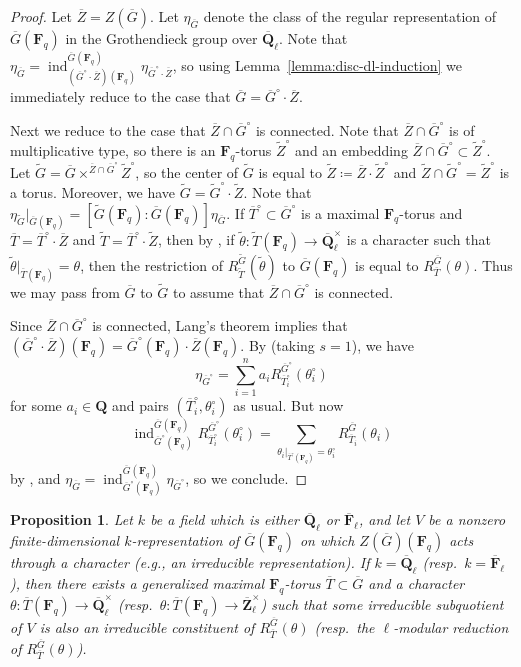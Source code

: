 \documentclass[reqno]{amsart}
\numberwithin{equation}{subsection}
\newcommand{\F}{\mathbf{F}}
\newcommand{\wt}[1]{\widetilde{#1}}
\newcommand{\Q}{\mathbf{Q}}
\newcommand{\Z}{\mathbf{Z}}
\newcommand{\ol}[1]{\overline{#1}}
\newcommand{\co}{\colon}
\DeclareMathOperator{\ind}{ind}
\newtheorem{prop}[thm]{Proposition}
\theoremstyle{remark}
\numberwithin{equation}{subsection}
\numberwithin{figure}{subsection}
\begin{document}
\begin{proof}
    Let $\ol Z = Z(\ol G)$. Let $\eta_{\ol G}$ denote the class of the regular representation of $\ol G(\F_q)$ in the Grothendieck group over $\ol\Q_\ell$. Note that $\eta_{\ol G} = \ind_{(\ol G^\circ \cdot \ol Z)(\F_q)}^{\ol G(\F_q)} \eta_{\ol G^\circ \cdot \ol Z}$, so using Lemma~\ref{lemma:disc-dl-induction} we immediately reduce to the case that $\ol G = \ol G^\circ \cdot \ol Z$.
    
    Next we reduce to the case that $\ol Z \cap \ol G^\circ$ is connected. Note that $\ol Z \cap \ol G^\circ$ is of multiplicative type, so there is an $\F_q$-torus $\wt Z^\circ$ and an embedding $\ol Z \cap \ol G^\circ \subset \wt Z^\circ$. Let $\wt G = \ol G \times^{\ol Z \cap \ol G^\circ} \wt Z^\circ$, so the center of $\wt G$ is equal to $\wt Z \coloneqq \ol Z \cdot \wt Z^\circ$ and $\wt Z \cap \wt G^\circ = \wt Z^\circ$ is a torus. Moreover, we have $\wt G = \wt G^\circ \cdot \wt Z$. Note that $\eta_{\wt G}|_{\ol G(\F_q)} = [\wt G(\F_q)\co \ol G(\F_q)] \eta_{\ol G}$. If $\ol T^\circ \subset \ol G^\circ$ is a maximal $\F_q$-torus and $\ol T = \ol T^\circ \cdot \ol Z$ and $\wt T = \ol T^\circ \cdot \wt Z$, then by \cite[Remark 2.6.5]{Kal21b}, if $\wt\theta\co \wt T(\F_q) \to \ol\Q_\ell^\times$ is a character such that $\wt\theta|_{\ol T(\F_q)} = \theta$, then the restriction of $R_{\wt T}^{\wt G}(\wt\theta)$ to $\ol G(\F_q)$ is equal to $R_{\ol T}^{\ol G}(\theta)$. Thus we may pass from $\ol G$ to $\wt G$ to assume that $\ol Z \cap \ol G^\circ$ is connected.
    
    Since $\ol Z \cap \ol G^\circ$ is connected, Lang's theorem implies that $(\ol G^\circ \cdot \ol Z)(\F_q) = \ol G^\circ(\F_q) \cdot \ol Z(\F_q)$. By \cite[Proposition~7.5]{DL76} (taking $s = 1$), we have
    \[
    \eta_{\ol G^\circ} = \sum_{i=1}^n a_i R_{\ol T_i^\circ}^{\ol G^\circ}(\theta_i^\circ)
    \]
    for some $a_i \in \Q$ and pairs $(\ol T_i^\circ, \theta_i^\circ)$ as usual. But now
    \[
    \ind_{\ol G^\circ(\F_q)}^{\ol G(\F_q)}R_{\ol T_i^\circ}^{\ol G^\circ}(\theta_i^\circ) = \sum_{\theta_i|_{\ol T^\circ(\F_q)} = \theta_i^\circ} R_{\ol T_i}^{\ol G}(\theta_i)
    \]
    by \cite[Remark 2.6.5]{Kal21b}, and $\eta_{\ol G} = \ind_{\ol G^\circ(\F_q)}^{\ol G(\F_q)} \eta_{\ol G^\circ}$, so we conclude.
\end{proof}

\begin{prop}\label{prop:dl-exhaustion}
    Let $k$ be a field which is either $\ol\Q_\ell$ or $\ol\F_\ell$, and let $V$ be a nonzero finite-dimensional $k$-representation of $\ol G(\F_q)$ on which $Z(\ol G)(\F_q)$ acts through a character (e.g., an irreducible representation). If $k = \ol\Q_\ell$ (resp.\ $k = \ol\F_\ell$), then there exists a generalized maximal $\F_q$-torus $\ol T \subset \ol G$ and a character $\theta\co \ol T(\F_q) \to \ol\Q_\ell^\times$ (resp.\ $\theta\co \ol T(\F_q) \to \ol\Z_\ell^\times$) such that some irreducible subquotient of $V$ is also an irreducible constituent of $R_{\ol T}^{\ol G}(\theta)$ (resp.\ the $\ell$-modular reduction of $R_{\ol T}^{\ol G}(\theta)$).
\end{prop}
\end{document}
